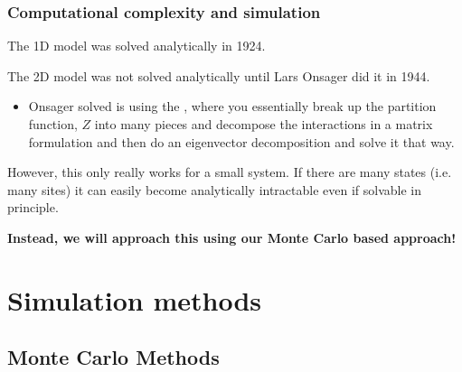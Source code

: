 \documentclass[hyperref={colorlinks=true}]{beamer}
\begin{document}
\begin{frame}%
  \frametitle{Computational complexity and simulation}
  
  The 1D model was solved analytically in 1924. 
  
  \vspace{0.3cm}
  
  The 2D model was not solved analytically until Lars Onsager did it in 1944. 
  \begin{itemize}
    \item Onsager solved is using the , where you essentially break up the partition function, $Z$ into many pieces and decompose the interactions in a matrix formulation and then do an eigenvector decomposition and solve it that way. 
  \end{itemize}
  
  \vspace{0.3cm}
  
  However, this only really works for a small system. If there are many states (i.e. many sites) it can easily become analytically intractable even if solvable in principle.
  
  \vspace{0.3cm}
  
  \begin{ucblock}{}
     \textbf{Instead, we will approach this using our Monte Carlo based approach!}
  \end{ucblock}
   
\end{frame}

\section[Simulation methods]{Simulation methods}

\subsection[Monte Carlo Methods]{Monte Carlo Methods}
\end{document}
